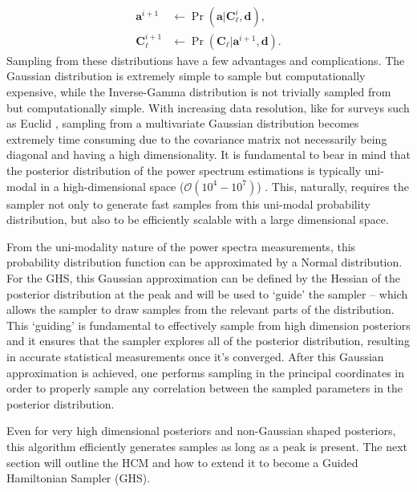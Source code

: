 \begin{align}
\mathbf{a}^{i+1} &\longleftarrow\Pr(\mathbf{a}|\textbf{C}_{\ell}^i,\mathbf{d}), \nonumber \\
\textbf{C}_{\ell}^{i+1} & \longleftarrow\Pr(\textbf{C}_{\ell}|\mathbf{a}^{i+1},\mathbf{d}).\nonumber
\end{align}
Sampling from these distributions have a few advantages and complications. The Gaussian distribution is extremely simple to sample but computationally expensive, while the Inverse-Gamma distribution is not trivially sampled from but computationally simple. With increasing data resolution, like for surveys such as Euclid \citep{2011EuclidRedPaper}, sampling from a multivariate Gaussian distribution becomes extremely time consuming due to the covariance matrix not necessarily being diagonal and having a high dimensionality. It is fundamental to bear in mind that the posterior distribution of the power spectrum estimations is typically uni-modal in a high-dimensional space ($\mathcal{O}(10^{4}-10^{7})$) \citep{Taylor2008,Wandelt2004}. This, naturally, requires the sampler not only to generate fast samples from this uni-modal probability distribution, but also to be efficiently scalable with a large dimensional space. 

\qquad From the uni-modality nature of the power spectra measurements, this probability distribution function can be approximated by a Normal distribution. For the GHS, this Gaussian approximation can be defined by the Hessian of the posterior distribution at the peak and will be used to `guide' the sampler -- which allows the sampler to draw samples from the relevant parts of the distribution. This `guiding' is fundamental to effectively sample from high dimension posteriors and it ensures that the sampler explores all of the posterior distribution, resulting in accurate statistical measurements once it's converged. After this Gaussian approximation is achieved, one performs sampling in the principal coordinates in order to properly sample any correlation between the sampled parameters in the posterior distribution. 

\qquad Even for very high dimensional posteriors and non-Gaussian shaped posteriors, this algorithm efficiently generates samples as long as a peak is present. The next section will outline the HCM and how to extend it to become a Guided Hamiltonian Sampler (GHS).

